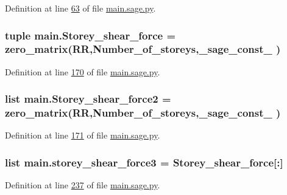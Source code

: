 Definition at line \hyperlink{main_8sage_8py_source_l00063}{63} of file \hyperlink{main_8sage_8py_source}{main.\+sage.\+py}.

\hypertarget{namespacemain_aaa52e7055409dcf0785880422294a704}{}
\subsubsection[{Storey\+\_\+shear\+\_\+force}]{\setlength{\rightskip}{0pt plus 5cm}tuple main.\+Storey\+\_\+shear\+\_\+force = zero\+\_\+matrix(R\+R,Number\+\_\+of\+\_\+storeys,\+\_\+sage\+\_\+const\+\_ )}\label{namespacemain_aaa52e7055409dcf0785880422294a704}


Definition at line \hyperlink{main_8sage_8py_source_l00170}{170} of file \hyperlink{main_8sage_8py_source}{main.\+sage.\+py}.

\hypertarget{namespacemain_ab6dd9cc05fd903a9da8b9734c44fef57}{}
\subsubsection[{Storey\+\_\+shear\+\_\+force2}]{\setlength{\rightskip}{0pt plus 5cm}list main.\+Storey\+\_\+shear\+\_\+force2 = zero\+\_\+matrix(R\+R,Number\+\_\+of\+\_\+storeys,\+\_\+sage\+\_\+const\+\_ )}\label{namespacemain_ab6dd9cc05fd903a9da8b9734c44fef57}


Definition at line \hyperlink{main_8sage_8py_source_l00171}{171} of file \hyperlink{main_8sage_8py_source}{main.\+sage.\+py}.

\hypertarget{namespacemain_aa741e0bac28acc57bb99fbe2b14205c7}{}
\subsubsection[{storey\+\_\+shear\+\_\+force3}]{\setlength{\rightskip}{0pt plus 5cm}list main.\+storey\+\_\+shear\+\_\+force3 = {\bf Storey\+\_\+shear\+\_\+force}\mbox{[}\+:\mbox{]}}\label{namespacemain_aa741e0bac28acc57bb99fbe2b14205c7}


Definition at line \hyperlink{main_8sage_8py_source_l00237}{237} of file \hyperlink{main_8sage_8py_source}{main.\+sage.\+py}.

